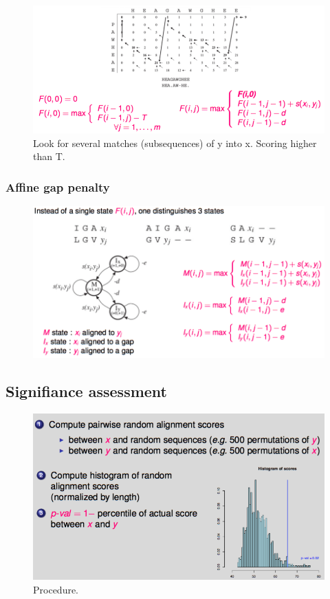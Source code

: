 \begin{figure}[H]
	\centering
	\includegraphics[scale=0.5]{images/13_repeats.png}
	\caption{Look for several matches (subsequences) of y into x. Scoring higher than T.}
\end{figure}

\subsubsection{Affine gap penalty}

\begin{figure}[H]
	\centering
	\includegraphics[scale=0.4]{images/14_affine.png}
\end{figure}

\subsection{Signifiance assessment}
\begin{figure}[htp]
	\centering
	\includegraphics[scale=0.4]{images/15_procedure.png}
	\caption{Procedure.}
\end{figure}

